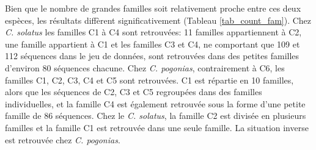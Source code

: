 \documentclass[12pt,a4paper]{article}
\begin{document}
	Bien que le nombre de grandes familles soit relativement proche entre ces deux espèces, les résultats diffèrent significativement (Tableau \ref{tab_count_fam}). Chez \textit{C. solatus} les familles C1 à C4 sont retrouvées: 11 familles appartiennent à C2, une famille appartient à C1 et les familles C3 et C4, ne comportant que 109 et 112 séquences dans le jeu de données, sont retrouvées dans des petites familles d'environ 80 séquences chacune. Chez \textit{C. pogonias}, contrairement à C6, les familles C1, C2, C3, C4 et C5 sont retrouvées. C1 est répartie en 10 familles, alors que les séquences de C2, C3 et C5 regroupées dans des familles individuelles, et la famille C4 est également retrouvée sous la forme d'une petite famille de 86 séquences. Chez le \textit{C. solatus}, la famille C2 est divisée en plusieurs familles et la famille C1 est retrouvée dans une seule famille. La situation inverse est retrouvée  chez \textit{C. pogonias}.
\end{document}
